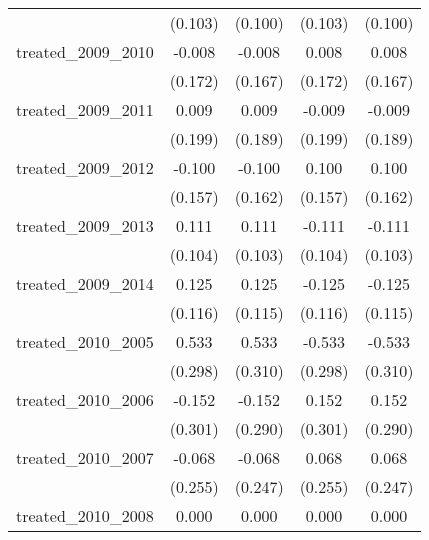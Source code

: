 {\begin{tabular}{l*{4}{c}}
            &     (0.103)         &     (0.100)         &     (0.103)         &     (0.100)         \\
[1em]
treated\_2009\_2010&      -0.008         &      -0.008         &       0.008         &       0.008         \\
            &     (0.172)         &     (0.167)         &     (0.172)         &     (0.167)         \\
[1em]
treated\_2009\_2011&       0.009         &       0.009         &      -0.009         &      -0.009         \\
            &     (0.199)         &     (0.189)         &     (0.199)         &     (0.189)         \\
[1em]
treated\_2009\_2012&      -0.100         &      -0.100         &       0.100         &       0.100         \\
            &     (0.157)         &     (0.162)         &     (0.157)         &     (0.162)         \\
[1em]
treated\_2009\_2013&       0.111         &       0.111         &      -0.111         &      -0.111         \\
            &     (0.104)         &     (0.103)         &     (0.104)         &     (0.103)         \\
[1em]
treated\_2009\_2014&       0.125         &       0.125         &      -0.125         &      -0.125         \\
            &     (0.116)         &     (0.115)         &     (0.116)         &     (0.115)         \\
[1em]
treated\_2010\_2005&       0.533         &       0.533         &      -0.533         &      -0.533         \\
            &     (0.298)         &     (0.310)         &     (0.298)         &     (0.310)         \\
[1em]
treated\_2010\_2006&      -0.152         &      -0.152         &       0.152         &       0.152         \\
            &     (0.301)         &     (0.290)         &     (0.301)         &     (0.290)         \\
[1em]
treated\_2010\_2007&      -0.068         &      -0.068         &       0.068         &       0.068         \\
            &     (0.255)         &     (0.247)         &     (0.255)         &     (0.247)         \\
[1em]
treated\_2010\_2008&       0.000         &       0.000         &       0.000         &       0.000         \\

\end{tabular}}
